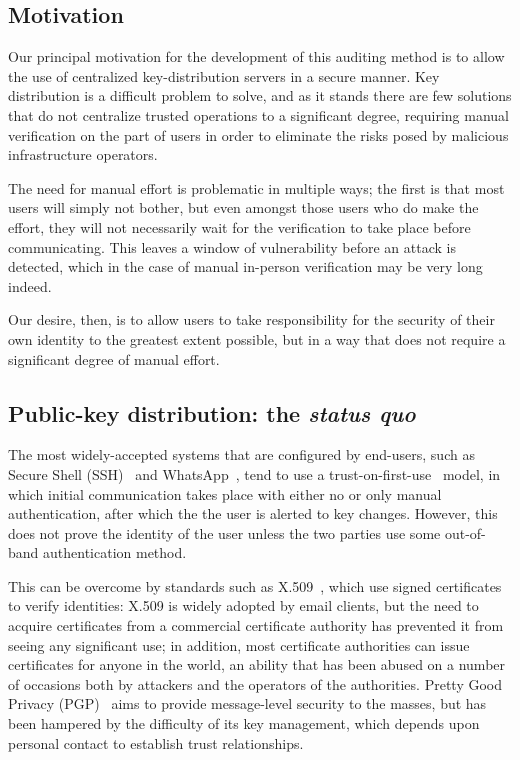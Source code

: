 \documentclass[USenglish]{llncs}
\begin{document}
\subsection{Motivation}
Our principal motivation for the development of this auditing method is to allow
the use of centralized key-distribution servers in a secure manner.
Key distribution is a difficult problem to solve, and as it stands there are few solutions
that do not centralize trusted operations to a significant degree, requiring manual
verification on the part of users in order to eliminate the risks posed by malicious
infrastructure operators.

The need for manual effort is problematic in multiple ways; the first is that most users
will simply not bother, but even amongst those users who do make the effort, they
will not necessarily wait for the verification to take place before communicating.  This
leaves a window of vulnerability before an attack is detected, which in the case of
manual in-person verification may be very long indeed.

Our desire, then, is to allow users to take responsibility for the security of their
own identity to the greatest extent possible, but in a way that does not require
a significant degree of manual effort.

\subsection{Public-key distribution: the \emph{status quo}}
The most widely-accepted systems that are configured by end-users,
such as Secure Shell (SSH)~\cite{rfc4251} and WhatsApp~\cite{whatsapp-crypto},
tend to use a trust-on-first-use~\cite{wendlandt-tofu}
model, in which initial communication takes place with either no
or only manual authentication, after which the the user is alerted 
to key changes.  However, this does not prove the identity of the user
unless the two parties use some out-of-band authentication method.

This can be overcome by standards such as X.509~\cite{rfc5280},
which use signed certificates to verify identities:
X.509 is widely adopted by email clients, but
the need to acquire certificates from a commercial certificate authority
has prevented it from seeing any significant use; in addition, most certificate
authorities can issue certificates for anyone in the world, an ability that has
been abused on a number of occasions both by attackers and the operators of
the authorities.
Pretty Good Privacy (PGP)~\cite{rfc4880} aims to provide message-level security to the
masses, but has been hampered by the difficulty of its key management,
which depends upon personal contact to establish trust relationships.
\end{document}
